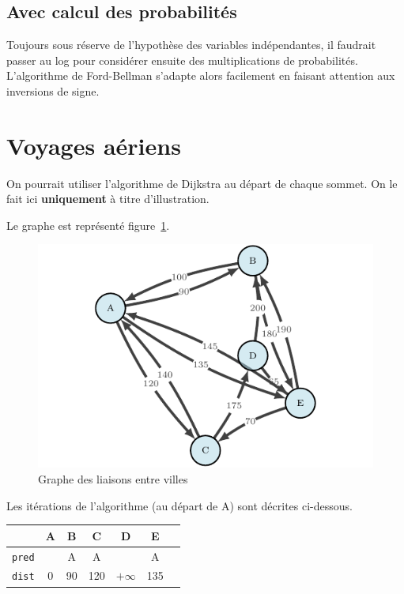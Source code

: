 \documentclass[paper=a4, fontsize=11pt]{scrartcl} %
\numberwithin{equation}{section} %
\numberwithin{figure}{section} %
\numberwithin{table}{section} %
\begin{document}
\subsection{Avec calcul des probabilités}

Toujours sous réserve de l'hypothèse des variables indépendantes, il faudrait passer au log pour considérer ensuite des multiplications de probabilités. L'algorithme de Ford-Bellman s'adapte alors facilement en faisant attention aux inversions de signe.


\section{Voyages aériens}

On pourrait utiliser l'algorithme de Dijkstra au départ de chaque sommet. On le fait ici \textbf{uniquement} à titre d'illustration.

Le graphe est représenté figure~\ref{fig:airline}.

\begin{figure}
  \begin{center}
    \includegraphics[width=12cm]{airline.pdf}
    \caption{Graphe des liaisons entre villes}
    \label{fig:airline}
  \end{center}
\end{figure}

Les itérations de l'algorithme (au départ de A) sont décrites ci-dessous. 

  
\begin{tabular}{c|cccccc}
  & \textbf{A}	&B	&C	&D	&E	& \\
  \hline
  \texttt{pred} &	&A	&A	&	&A	&\\
  \texttt{dist} & 0	&90	&120	&$+\infty$	&135	&\\
\end{tabular}
\end{document}
